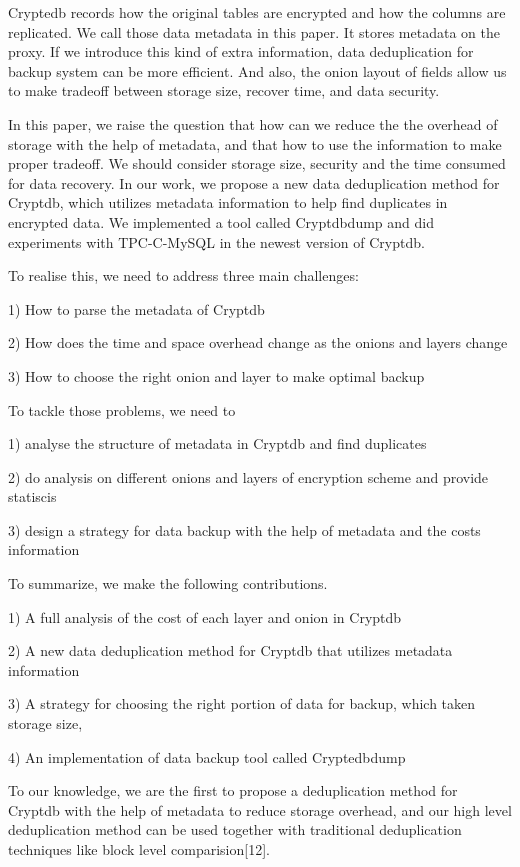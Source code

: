 Cryptedb records how the original tables are encrypted and how the columns are replicated. We call those data metadata in this paper. It stores metadata on the proxy. If we introduce this kind of extra information, data deduplication for backup system can be more efficient. And also, the onion layout of fields allow us to make tradeoff between storage size, recover time, and data security.


In this paper, we raise the question that how can we reduce the the overhead of storage with the help of metadata, and that how to use the information to make proper tradeoff. We should consider storage size, security and the time consumed for data recovery. In our work, we propose a new data deduplication method for Cryptdb, which utilizes metadata information to help find duplicates in encrypted data. We implemented a tool called Cryptdbdump and did experiments with TPC-C-MySQL in the newest version of Cryptdb.


To realise this, we need to address three main challenges:

1) How to parse the metadata of Cryptdb

2) How  does the time and space overhead change as the onions and layers change

3) How to choose the right onion and layer to make optimal backup


To tackle those problems, we need to

1) analyse the structure of metadata in Cryptdb and find duplicates

2) do analysis on different onions and layers of encryption scheme and provide statiscis

3) design a strategy for data backup with the help of metadata and the costs information 

To summarize, we make the following contributions.

1) A full analysis of the cost of each layer and onion in Cryptdb

2) A new data deduplication method for Cryptdb that utilizes metadata information 

3) A strategy for choosing the right portion of data for backup, which taken storage size, 

4) An implementation of data backup tool called Cryptedbdump 

To our knowledge, we are the first to propose a deduplication method for Cryptdb with the help of metadata to reduce storage overhead, and our high level deduplication method can be used together with traditional deduplication techniques like block level comparision[12].

